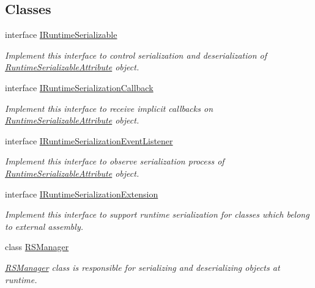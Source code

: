 \subsection*{Classes}
\begin{DoxyCompactItemize}
\item 
interface \hyperlink{interface_voxel_busters_1_1_runtime_serialization_1_1_i_runtime_serializable}{I\+Runtime\+Serializable}
\begin{DoxyCompactList}\small\item\em Implement this interface to control serialization and deserialization of \hyperlink{class_voxel_busters_1_1_runtime_serialization_1_1_runtime_serializable_attribute}{Runtime\+Serializable\+Attribute} object. \end{DoxyCompactList}\item 
interface \hyperlink{interface_voxel_busters_1_1_runtime_serialization_1_1_i_runtime_serialization_callback}{I\+Runtime\+Serialization\+Callback}
\begin{DoxyCompactList}\small\item\em Implement this interface to receive implicit callbacks on \hyperlink{class_voxel_busters_1_1_runtime_serialization_1_1_runtime_serializable_attribute}{Runtime\+Serializable\+Attribute} object. \end{DoxyCompactList}\item 
interface \hyperlink{interface_voxel_busters_1_1_runtime_serialization_1_1_i_runtime_serialization_event_listener}{I\+Runtime\+Serialization\+Event\+Listener}
\begin{DoxyCompactList}\small\item\em Implement this interface to observe serialization process of \hyperlink{class_voxel_busters_1_1_runtime_serialization_1_1_runtime_serializable_attribute}{Runtime\+Serializable\+Attribute} object. \end{DoxyCompactList}\item 
interface \hyperlink{interface_voxel_busters_1_1_runtime_serialization_1_1_i_runtime_serialization_extension}{I\+Runtime\+Serialization\+Extension}
\begin{DoxyCompactList}\small\item\em Implement this interface to support runtime serialization for classes which belong to external assembly. \end{DoxyCompactList}\item 
class \hyperlink{class_voxel_busters_1_1_runtime_serialization_1_1_r_s_manager}{R\+S\+Manager}
\begin{DoxyCompactList}\small\item\em \hyperlink{class_voxel_busters_1_1_runtime_serialization_1_1_r_s_manager}{R\+S\+Manager} class is responsible for serializing and deserializing objects at runtime. \end{DoxyCompactList}\item 

\end{DoxyCompactItemize}
